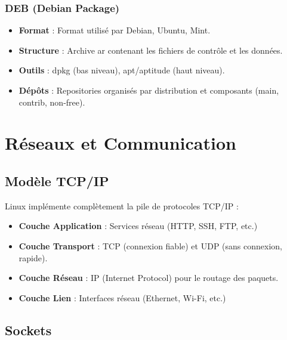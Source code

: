 \documentclass[12pt,a4paper]{article}
\begin{document}
\subsubsection{DEB (Debian Package)}

\begin{itemize}
    \item \textbf{Format} : Format utilisé par Debian, Ubuntu, Mint.
    
    \item \textbf{Structure} : Archive ar contenant les fichiers de contrôle et les données.
    
    \item \textbf{Outils} : dpkg (bas niveau), apt/aptitude (haut niveau).
    
    \item \textbf{Dépôts} : Repositories organisés par distribution et composants (main, contrib, non-free).
\end{itemize}


\section{Réseaux et Communication}

\subsection{Modèle TCP/IP}

Linux implémente complètement la pile de protocoles TCP/IP :

\begin{itemize}
    \item \textbf{Couche Application} : Services réseau (HTTP, SSH, FTP, etc.)
    
    \item \textbf{Couche Transport} : TCP (connexion fiable) et UDP (sans connexion, rapide).
    
    \item \textbf{Couche Réseau} : IP (Internet Protocol) pour le routage des paquets.
    
    \item \textbf{Couche Lien} : Interfaces réseau (Ethernet, Wi-Fi, etc.)
\end{itemize}

\subsection{Sockets}
\end{document}
